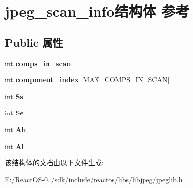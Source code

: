 \hypertarget{structjpeg__scan__info}{}\section{jpeg\+\_\+scan\+\_\+info结构体 参考}
\label{structjpeg__scan__info}
\subsection*{Public 属性}
\begin{DoxyCompactItemize}
\item 
\mbox{\label{structjpeg__scan__info_addd94bff3ee52f961cf6fda5ea86ddca}} 
int {\bfseries comps\+\_\+in\+\_\+scan}
\item 
\mbox{\label{structjpeg__scan__info_a041f1af60508517345c1b76c48ee6567}} 
int {\bfseries component\+\_\+index} \mbox{[}M\+A\+X\+\_\+\+C\+O\+M\+P\+S\+\_\+\+I\+N\+\_\+\+S\+C\+AN\mbox{]}
\item 
\mbox{\label{structjpeg__scan__info_a33bc5abcded36ccd1b4c2ec94f6e2ba5}} 
int {\bfseries Ss}
\item 
\mbox{\label{structjpeg__scan__info_a4eefb8be0412f78566862c28a20fb254}} 
int {\bfseries Se}
\item 
\mbox{\label{structjpeg__scan__info_a43834ca9482c7ea12cc97cf602da004b}} 
int {\bfseries Ah}
\item 
\mbox{\label{structjpeg__scan__info_a89cc9e990977c50b2b2058e6b9526e67}} 
int {\bfseries Al}
\end{DoxyCompactItemize}


该结构体的文档由以下文件生成\+:\begin{DoxyCompactItemize}
\item 
E\+:/\+React\+O\+S-\/0../sdk/include/reactos/libs/libjpeg/jpeglib.\+h\end{DoxyCompactItemize}
